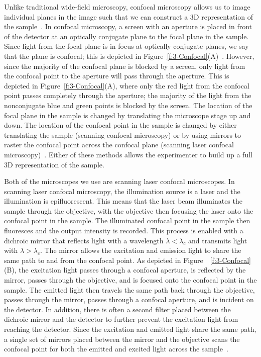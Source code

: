 Unlike traditional wide-field microscopy, confocal microscopy allows us to image individual planes in the image such that we can construct a 3D representation of the sample~\cite{RN260}.
In confocal microscopy, a screen with an aperture is placed in front of the detector at an optically conjugate plane to the focal plane in the sample.
Since light from the focal plane is in focus at optically conjugate planes, we say that the plane is confocal; this is depicted in Figure~\ref{f:3-Confocal}(A)~\cite{RN259}.
However, since the majority of the confocal plane is blocked by a screen, only light from the confocal point to the aperture will pass through the aperture.
This is depicted in Figure~\ref{f:3-Confocal}(A), where only the red light from the confocal point passes completely through the aperture; the majority of the light from the nonconjugate blue and green points is blocked by the screen.
The location of the focal plane in the sample is changed by translating the microscope stage up and down.
The location of the confocal point in the sample is changed by either translating the sample (scanning confocal microscopy) or by using mirrors to raster the confocal point across the confocal plane (scanning laser confocal microscopy)~\cite{RN261,RN262,RN260}.
Either of these methods allows the experimenter to build up a full 3D representation of the sample.

Both of the microscopes we use are scanning laser confocal microscopes.
In scanning laser confocal microscopy, the illumination source is a laser and the illumination is epifluorescent.
This means that the laser beam illuminates the sample through the objective, with the objective then focusing the laser onto the confocal point in the sample.
The illuminated confocal point in the sample then fluoresces and the output intensity is recorded.
This process is enabled with a dichroic mirror that reflects light with a wavelength $\lambda < \lambda_c$ and transmits light with $\lambda > \lambda_c$.
The mirror allows the excitation and emission light to share the same path to and from the confocal point.
As depicted in Figure~~\ref{f:3-Confocal}(B), the excitation light passes through a confocal aperture, is reflected by the mirror, passes through the objective, and is focused onto the confocal point in the sample.
The emitted light then travels the same path back through the objective, passes through the mirror, passes through a confocal aperture, and is incident on the detector.
In addition, there is often a second filter placed between the dichroic mirror and the detector to further prevent the excitation light from reaching the detector.
Since the excitation and emitted light share the same path, a single set of mirrors placed between the mirror and the objective scans the confocal point for both the emitted and excited light across the sample~\cite{RN260}.

